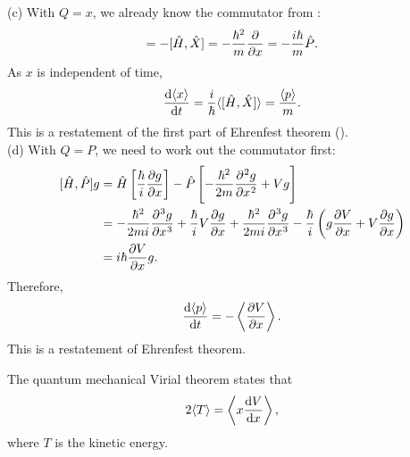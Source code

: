 (c) With $Q=x$, we already know the commutator from : 
\begin{equation}
[\hat{H},\hat{X}]=-[\hat{H},\hat{X}]=-\frac{\hbar^2}{m}\diffp{}{x}=-\frac{i\hbar}{m}\hat{P}.
\end{equation}
As $x$ is independent of time,
\begin{equation}
\diff{\lgl x\rgl}t=\frac{i}{\hbar}\lgl [\hat{H},\hat{X}]\rgl=\frac{\lgl p\rgl}{m}.
\end{equation}
This is a restatement of the first part of Ehrenfest theorem (). \\
(d) With $Q=P$, we need to work out the commutator first: 
\begin{subequations}
\begin{align}
[\hat{H},\hat{P}]g&=\hat{H}\lf[\frac{\hbar}{i}\diffp gx \rt]-\hat{P}\lf[-\frac{\hbar^2}{2m}\diffp[2] gx+Vg \rt]\\
&=-\frac{\hbar^2}{2mi}\diffp[3] gx+\frac{\hbar}{i}V\diffp gx+\frac{\hbar^2}{2mi}\diffp[3] gx-\frac{\hbar}{i}\lf(g\diffp Vx+V\diffp gx \rt)\\
&=i\hbar\diffp Vx g.
\end{align}
\end{subequations}
Therefore, 
\begin{equation}
\diff {\lgl p\rgl}t=-\lf<\diffp Vx\rt>.
\end{equation}
This is a restatement of Ehrenfest theorem. 
\begin{thrm}
\label{virial_thrm}
The quantum mechanical Virial theorem states that
\begin{equation}
2 \lgl T\rgl=\lf<x\diff Vx \rt>, 
\end{equation}
where $T$ is the kinetic energy.
\end{thrm}
